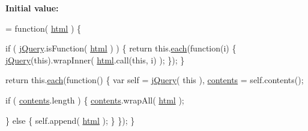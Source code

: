 {\bfseries Initial value\-:}
\begin{DoxyCode}
= \textcolor{keyword}{function}( \hyperlink{jquery-1_810_82-vsdoc_8js_a54a716632718016dd4e400e83a0970e2}{html} ) \{


        \textcolor{keywordflow}{if} ( \hyperlink{jquery-1_810_82-vsdoc_8js_add5237586d970a38a81f990e8eb28c6c}{jQuery}.isFunction( \hyperlink{jquery-1_810_82-vsdoc_8js_a54a716632718016dd4e400e83a0970e2}{html} ) ) \{
            \textcolor{keywordflow}{return} this.\hyperlink{jquery-1_810_82-vsdoc_8js_aae0bcb6b00035445a8f9b262c96ea8a2}{each}(\textcolor{keyword}{function}(i) \{
                \hyperlink{jquery-1_810_82-vsdoc_8js_add5237586d970a38a81f990e8eb28c6c}{jQuery}(\textcolor{keyword}{this}).wrapInner( \hyperlink{jquery-1_810_82-vsdoc_8js_a54a716632718016dd4e400e83a0970e2}{html}.call(\textcolor{keyword}{this}, i) );
            \});
        \}

        \textcolor{keywordflow}{return} this.\hyperlink{jquery-1_810_82-vsdoc_8js_aae0bcb6b00035445a8f9b262c96ea8a2}{each}(\textcolor{keyword}{function}() \{
            var \textcolor{keyword}{self} = \hyperlink{jquery-1_810_82-vsdoc_8js_add5237586d970a38a81f990e8eb28c6c}{jQuery}( \textcolor{keyword}{this} ),
                \hyperlink{jquery-1_810_82-vsdoc_8js_af81eeab332c74dc521f6610f4914badd}{contents} = \textcolor{keyword}{self}.contents();

            \textcolor{keywordflow}{if} ( \hyperlink{jquery-1_810_82-vsdoc_8js_af81eeab332c74dc521f6610f4914badd}{contents}.length ) \{
                \hyperlink{jquery-1_810_82-vsdoc_8js_af81eeab332c74dc521f6610f4914badd}{contents}.wrapAll( \hyperlink{jquery-1_810_82-vsdoc_8js_a54a716632718016dd4e400e83a0970e2}{html} );

            \} \textcolor{keywordflow}{else} \{
                \textcolor{keyword}{self}.append( \hyperlink{jquery-1_810_82-vsdoc_8js_a54a716632718016dd4e400e83a0970e2}{html} );
            \}
        \});
    \}
\end{DoxyCode}
